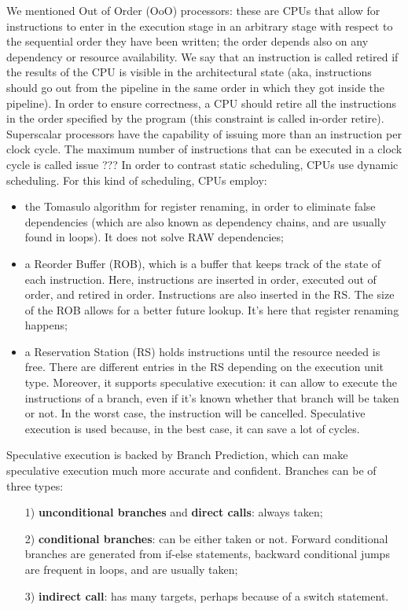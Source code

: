 We mentioned Out of Order (OoO) processors: these are CPUs that allow for instructions to enter in the execution stage in an arbitrary stage with respect to the sequential order they have been written; the order depends also on any dependency or resource availability. We say that an instruction is called retired if the results of the CPU is visible in the architectural state (aka, instructions should go out from the pipeline in the same order in which they got inside the pipeline). In order to ensure correctness, a CPU should retire all the instructions in the order specified by the program (this constraint is called in-order retire).
\nwl
Superscalar processors have the capability of issuing more than an instruction per clock cycle. The maximum number of instructions that can be executed in a clock cycle is called issue ??? %
\nwl
In order to contrast static scheduling, CPUs use dynamic scheduling. For this kind of scheduling, CPUs employ:
\begin{itemize}
    \item the Tomasulo algorithm for register renaming, in order to eliminate false dependencies (which are also known as dependency chains, and are usually found in loops). It does not solve RAW dependencies;
    \item a Reorder Buffer (ROB), which is a buffer that keeps track of the state of each instruction. Here, instructions are inserted in order, executed out of order, and retired in order. Instructions are also inserted in the RS. The size of the ROB allows for a better future lookup. It's here that register renaming happens;
    \item a Reservation Station (RS) holds instructions until the resource needed is free. There are different entries in the RS depending on the execution unit type. Moreover, it supports speculative execution: it can allow to execute the instructions of a branch, even if it's known whether that branch will be taken or not. In the worst case, the instruction will be cancelled. Speculative execution is used because, in the best case, it can save a lot of cycles. 
\end{itemize}

Speculative execution is backed by Branch Prediction, which can make speculative execution much more accurate and confident. Branches can be of three types:
\begin{itemize}
    \item [1)] \textbf{unconditional branches} and \textbf{direct calls}: always taken;
    \item [2)] \textbf{conditional branches}: can be either taken or not. Forward conditional branches are generated from if-else statements, backward conditional jumps are frequent in loops, and are usually taken;
    \item [3)] \textbf{indirect call}: has many targets, perhaps because of a switch statement.
\end{itemize}

